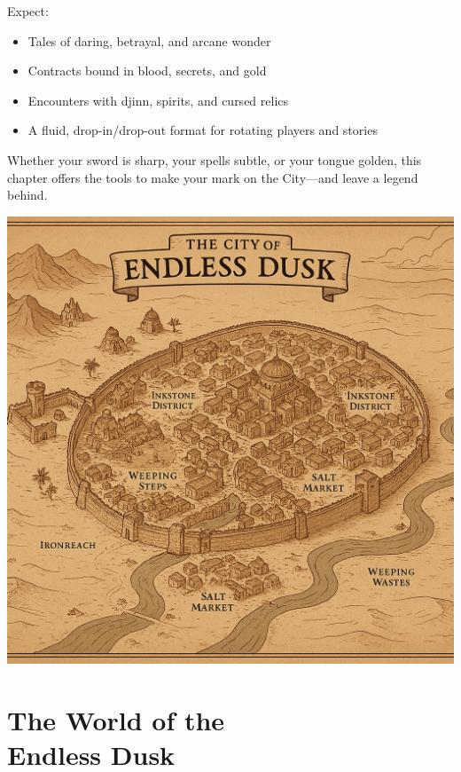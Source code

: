 \noindent Expect:
\begin{itemize}\raggedright
    \item Tales of daring, betrayal, and arcane wonder
    \item Contracts bound in blood, secrets, and gold
    \item Encounters with djinn, spirits, and cursed relics
    \item A fluid, drop-in/drop-out format for rotating players and stories
\end{itemize}

\vspace{.75\baselineskip}\noindent
Whether your sword is sharp, your spells subtle, or your tongue golden, this chapter offers the tools to make your mark on the City—and leave a legend behind.


\begin{center}
    \includegraphics[width=\linewidth]{img/pageart/endless-dusk-map}
\end{center}


\section[The World of the Endless Dusk]{The World of the\\ Endless Dusk}

